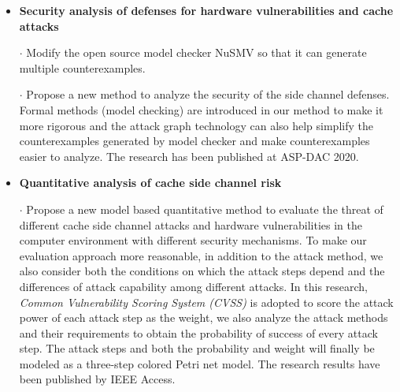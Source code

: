 \documentclass[11pt]{article}
\begin{document}
\begin{itemize}
\vspace{-.3cm}

\item {\bf Security analysis of defenses for hardware vulnerabilities and cache attacks}\\
\vspace{-.3cm}

$\cdot$ Modify the open source model checker NuSMV so that it can generate multiple counterexamples.\\
\vspace{-.3cm}

$\cdot$ Propose a new method to analyze the security of the side channel defenses. Formal methods (model checking) are introduced in our method to make it more rigorous and the attack graph technology can also help simplify the counterexamples generated by model checker and make counterexamples easier to analyze. The research has been published at ASP-DAC 2020.
\end{itemize}


\begin{itemize}
\item {\bf Quantitative analysis of cache side channel risk }\\
\vspace{-.3cm}

$\cdot$ Propose a new model based quantitative method to evaluate the threat of different cache side channel attacks and hardware vulnerabilities in the computer environment with different security mechanisms. To make our evaluation approach more reasonable, in addition to the attack method, we also consider both the conditions on which the attack steps depend and the differences of attack capability among different attacks. In this research, \emph{Common Vulnerability Scoring System (CVSS)} is adopted to score the attack power of each attack step as the weight, we also analyze the attack methods and their requirements to obtain the probability of success of every attack step. The attack steps and both the probability and weight will finally be modeled as a three-step colored Petri net model. The research results have been published by IEEE Access. \\
\end{itemize}
\end{document}
